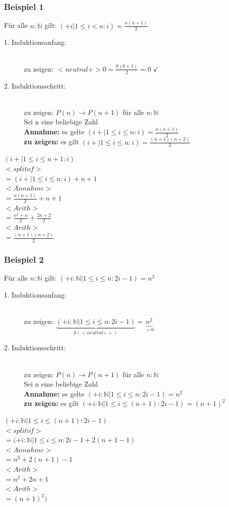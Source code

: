 \documentclass[a4paper,10pt]{article}
\newcommand{\NN}{\mathbb{N}} %
\newcommand{\Bold}[1]{\textbf{#1}} %
\newcommand{\ra}{\rightarrow}
\begin{document}
\subsubsection{Beispiel 1}
F\"ur alle $n:\NN$ gilt: $(+ i | 1 \leq i < n : i) = \frac{n(n+1)}{2}$ 
\begin{description}
	\item[1. Induktionsanfang:] \hfill \\
		zu zeigen: $<neutral+>0 = \frac{0(0+1)}{2}=0$ $\checkmark$
	\item[2. Induktionsschritt:] \hfill \\
		zu zeigen: $P(n) \ra P(n+1)$ f\"ur alle $n:\NN$ \\
		Sei n eine beliebige Zahl \\
		\Bold {Annahme:} es gelte $(i+|1 \leq i \leq n : i)=\frac{n(n+1)}{2}$ \\
		\Bold {zu zeigen:} es gilt $(i+|1 \leq i \leq n : i)=\frac{(n+1)(n+2)}{2}$ \\
\end{description}
$(i+|1 \leq i \leq n+1 : i)$ \\ $<splitof>$ \\
$=(i+|1 \leq i \leq n : i) + n + 1$ \\ $<Annahme>$ \\
$=\frac{n(n+1)}{2}+n+1$ \\ $<Arith>$ \\
$= \frac{n^2+n}{2} + \frac{2n+2}{2}$ \\ $<Arith>$ \\
$=\frac{(n+1)(n+2)}{2}$

\subsubsection{Beispiel 2}
F\"ur alle $n:\NN$ gilt: $(+ i :\NN| 1 \leq i \leq n : 2i-1) = n^2$ 
\begin{description}
	\item[1. Induktionsanfang:] \hfill \\
		zu zeigen: $\underbrace{(+ i :\NN| 1 \leq i \leq n : 2i-1)}_{0 (<neutral+>)} = \underbrace{n^2}_{=0}$
	\item[2. Induktionsschritt:] \hfill \\
		zu zeigen: $P(n) \ra P(n+1)$ f\"ur alle $n:\NN$ \\
		Sei n eine beliebige Zahl \\
		\Bold {Annahme:} es gelte $(+ i :\NN| 1 \leq i \leq n : 2i-1)=n^2$ \\
		\Bold {zu zeigen:} es gilt $(+ i :\NN| 1 \leq i \leq (n+1) : 2i-1)=(n+1)^2$ \\
\end{description}
$(+ i :\NN| 1 \leq i \leq (n+1) : 2i-1)$  \\ $<splitof>$ \\
$=(+ i :\NN| 1 \leq i \leq n : 2i-1 + 2(n+1-1)$ \\ $<Annahme>$ \\
$=n^2 + 2(n+1)-1$ \\ $<Arith>$ \\
$= n^2+2n+1$ \\ $<Arith>$ \\
$=(n+1)^2)$
\end{document}

